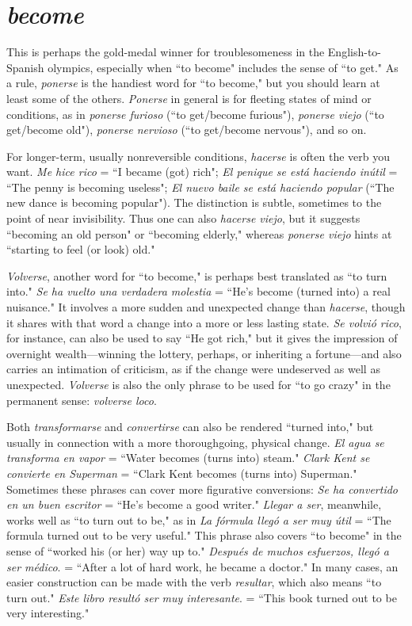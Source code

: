 \section{\emph{become}}

This is perhaps the gold-medal winner for troublesomeness
in the English-to-Spanish olympics, especially when ``to become" includes the sense of ``to get." As a rule, \emph{ponerse} is the handiest word for
``to become," but you should learn at least some of the others. \emph{Ponerse}
in general is for fleeting states of mind or conditions, as in \emph{ponerse furioso} (``to get/become furious"), \emph{ponerse viejo} (``to get/become old"),
\emph{ponerse nervioso} (``to get/become nervous"), and so on.

For longer-term, usually nonreversible conditions, \emph{hacerse} is
often the verb you want. \emph{Me hice rico} = ``I became (got) rich"; \emph{El penique se está haciendo inútil} = ``The penny is becoming useless"; \emph{El
	nuevo baile se está haciendo popular} (``The new dance is becoming
popular"). The distinction is subtle, sometimes to the point of near
invisibility. Thus one can also \emph{hacerse viejo}, but it suggests ``becoming
an old person" or ``becoming elderly," whereas \emph{ponerse viejo} hints at
``starting to feel (or look) old."

\emph{Volverse}, another word for ``to become," is perhaps best translated as ``to turn into." \emph{Se ha vuelto una verdadera molestia} = ``He's
become (turned into) a real nuisance." It involves a more sudden and
unexpected change than \emph{hacerse}, though it shares with that word a
change into a more or less lasting state. \emph{Se volvió rico}, for instance,
can also be used to say ``He got rich," but it gives the impression of
overnight wealth---winning the lottery, perhaps, or inheriting a fortune---and also carries an intimation of criticism, as if the change were
undeserved as well as unexpected. \emph{Volverse} is also the only phrase to
be used for ``to go crazy" in the permanent sense: \emph{volverse loco}.

Both \emph{transformarse} and \emph{convertirse} can also be rendered
``turned into," but usually in connection with a more thoroughgoing,
physical change. \emph{El agua se transforma en vapor} = ``Water becomes
(turns into) steam." \emph{Clark Kent se convierte en Superman} = ``Clark
Kent becomes (turns into) Superman." Sometimes these phrases can
cover more figurative conversions: \emph{Se ha convertido en un buen escritor} = ``He's become a good writer." \emph{Llegar a ser}, meanwhile, works
well as ``to turn out to be," as in \emph{La fórmula llegó a ser muy útil} =
``The formula turned out to be very useful." This phrase also covers
``to become" in the sense of ``worked his (or her) way up to." \emph{Después
	de muchos esfuerzos, llegó a ser médico}. = ``After a lot of hard work,
he became a doctor." In many cases, an easier construction can be
made with the verb \emph{resultar}, which also means ``to turn out." \emph{Este libro resultó ser muy interesante}. = ``This book turned out to be very
interesting."

